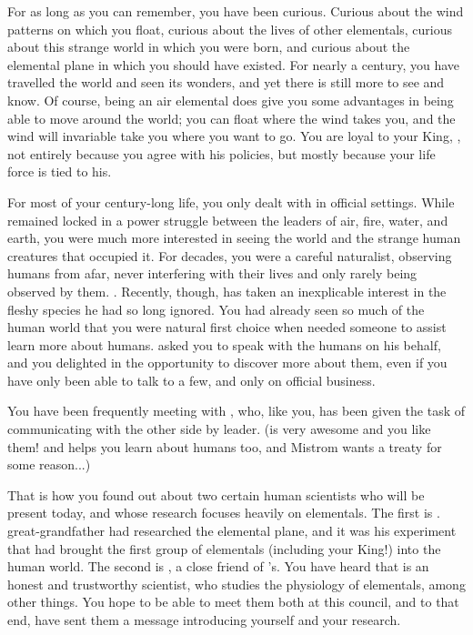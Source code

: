 \documentclass[char]{elementals}
\begin{document}
\name{\cNaturalist{}}

For as long as you can remember, you have been curious.  Curious about the wind patterns on which you float, curious about the lives of other elementals, curious about this strange world in which you were born, and curious about the elemental plane in which you should have existed.  For nearly a century, you have travelled the world and seen its wonders, and yet there is still more to see and know.  Of course, being an air elemental does give you some advantages in being able to move around the world; you can float where the wind takes you, and the wind will invariable take you where you want to go.  You are loyal to your King, \cKing{\intro}, not entirely because you agree with his policies, but mostly because your life force is tied to his.

For most of your century-long life, you only dealt with \cKing{} in official settings.  While \cKing{} remained locked in a power struggle between the leaders of air, fire, water, and earth, you were much more interested in seeing the world and the strange human creatures that occupied it.  For decades, you were a careful naturalist, observing humans from afar, never interfering with their lives and only rarely being observed by them.  .  Recently, though, \cKing{} has taken an inexplicable interest in the fleshy species he had so long ignored.  You had already seen so much of the human world that you were \cKing{\their} natural first choice when \cKing{\they} needed someone to assist \cKing{\them} learn more about humans.  \cKing{\They} asked you to speak with the humans on his behalf, and you delighted in the opportunity to discover more about them, even if you have only been able to talk to a few, and only on official business.

You have been frequently meeting with \cDiplomat{\intro}, who, like you, has been given the task of communicating with the other side by \cDiplomat{\their} leader.   (is very awesome and you like them! and helps you learn about humans too, and Mistrom wants a treaty for some reason...)

That is how you found out about two certain human scientists who will be present today, and whose research focuses heavily on elementals.  The first is \cGD{\intro}.  \cGD{\Their} great-grandfather had researched the elemental plane, and it was his experiment that had brought the first group of elementals (including your King!) into the human world.  The second is \cScientist{\intro}, a close friend of \cDiplomat{}'s.  You have heard that \cScientist{} is an honest and trustworthy scientist, who studies the physiology of elementals, among other things.  You hope to be able to meet them both at this council, and to that end, have sent them a message introducing yourself and your research.
\end{document}
